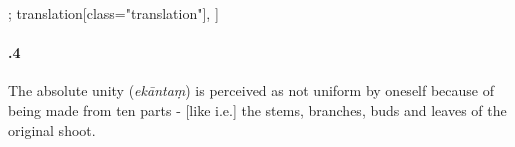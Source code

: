 \begin{alignment}[
  texts=edition[class="edition"];
  translation[class="translation"],
  ]
\begin{translation}
\begin{tlate}[21_4]
\paragraph{.4} The absolute unity (\textit{ekāntaṃ}) is perceived as not uniform by oneself because of being made from ten parts - [like i.e.] the stems, branches, buds and leaves of the original shoot.
\flushpage 
\end{tlate}
\end{translation}
\end{alignment}
\pagebreak %
